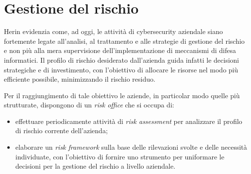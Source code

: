 \section{Gestione del rischio}
Herin evidenzia come, ad oggi, le attività di cybersecurity aziendale
siano fortemente legate all'analisi, al trattamento e alle strategie di gestione
del rischio e non più alla mera supervisione dell'implementazione di meccanismi di difesa informatici. 
Il profilo di rischio desiderato dall'azienda guida infatti le 
decisioni strategiche e di investimento, con l'obiettivo di allocare le risorse 
nel modo più efficiente possibile, minimizzando il rischio residuo.

Per il raggiungimento di tale obiettivo le aziende, in particolar modo quelle più 
strutturate, dispongono di un \textit{risk office} che si occupa di:
\begin{itemize}
    \item effettuare periodicamente attività di \textit{risk assessment} per analizzare il 
    profilo di rischio corrente dell'azienda;
    \item elaborare un \textit{risk framework} sulla base delle rilevazioni
    svolte e delle necessità individuate, con l'obiettivo di fornire uno strumento
    per uniformare le decisioni per la gestione del rischio a livello aziendale.
\end{itemize}

